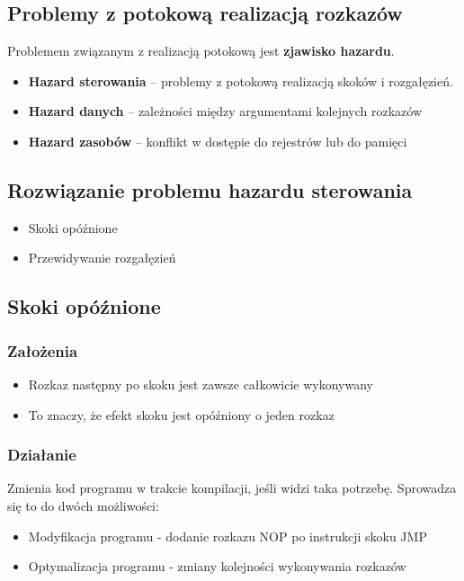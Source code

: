    	\subsection{Problemy z potokową realizacją rozkazów}
   		Problemem związanym z realizacją potokową jest \textbf{zjawisko hazardu}.
	   	\begin{itemize}
	   		\item \textbf{Hazard sterowania }– problemy z potokową realizacją skoków i rozgałęzień.
	   		\item \textbf{Hazard danych} – zależności między argumentami kolejnych rozkazów
	   		\item \textbf{Hazard zasobów} – konflikt w dostępie do rejestrów lub do pamięci
	   	\end{itemize}
   	\subsection{Rozwiązanie problemu hazardu sterowania}
	   	\begin{itemize}
	   		\item Skoki opóźnione
	   		\item Przewidywanie rozgałęzień
	   	\end{itemize}
	   	
	\newpage
   	\subsection{Skoki opóźnione}
	   	\subsubsection{Założenia}
		   	\begin{itemize}
		   		\item Rozkaz następny po skoku jest zawsze całkowicie wykonywany
		   		\item To znaczy, że efekt skoku jest opóźniony o jeden rozkaz
		   	\end{itemize}
   		\subsubsection{Działanie}
   			Zmienia kod programu w trakcie kompilacji, jeśli widzi taka potrzebę. Sprowadza się to do dwóch możliwości:
		   	\begin{itemize}
		   		\item Modyfikacja programu - dodanie rozkazu NOP po instrukcji skoku JMP
		   		\item Optymalizacja programu - zmiany kolejności wykonywania rozkazów
		   	\end{itemize}
		   	

